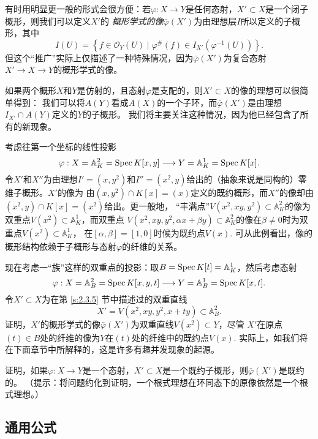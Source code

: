 有时用明显更一般的形式会很方便：若$\varphi: X\to Y$是任何态射，$X'\subset X$是一个闭子概形，则我们可以定义$X'$的
\textit{概形学式的像}$\bar\varphi(X')$为由理想层$I$所以定义的子概形，其中
\[
    I(U)=\left\{f \in \mathscr{O}_Y(U) \mid \varphi^{\#}(f) \in I_{X'}\left(\varphi^{-1}(U)\right)\right\}.
\]%
但这个“推广”实际上仅描述了一种特殊情况，因为$\bar\varphi(X')$为复合态射$X'\to X\to Y$的概形学式的像。

如果两个概形$X$和$Y$是仿射的，且态射$\varphi$是支配的，则$X'\subset X$的像的理想可以很简单得到：
我们可以将$A(Y)$看成$A(X)$的一个子环，而$\bar\varphi(X')$是由理想$I_{X'}\cap A(Y)$定义的$Y$的子概形。
我们将主要关注这种情况，因为他已经包含了所有的新现象。

考虑往第一个坐标的线性投影
\[
    \varphi: X=\mathbb{A}_K^2=\operatorname{Spec} K[x, y] \longrightarrow Y=\mathbb{A}_K^1=\operatorname{Spec} K[x].
\]
令$X'$和$X''$为由理想$I'=(x,y^2)$和$I''=(x^2,y)$给出的（抽象来说是同构的）零维子概形。$X'$的像为
由$(x,y^2)\cap K[x]=(x)$定义的既约概形，而$X''$的像却由$(x^2,y)\cap K[x]=(x^2)$给出。更一般地，
“丰满点”$V(x^2,xy,y^2)\subset \mathbb A_K^2$的像为双重点$V(x^2)\subset \mathbb A_K^1$，而双重点
$V(x^2,xy,y^2,\alpha x+\beta y)\subset \mathbb A_K^2$的像在$\beta\neq 0$时为双重点$V(x^2)\subset \mathbb A_K^1$，
在$[\alpha,\beta]=[1,0]$时候为既约点$V(x)$. 可从此例看出，像的概形结构依赖于子概形与态射$\varphi$的纤维的关系。


\begin{exe}\label{exe:5.4}
    现在考虑一“族”这样的双重点的投影：取$B=\operatorname{Spec} K[t]=\mathbb A_K^1$，然后考虑态射
    \[
        \varphi: X=\mathbb{A}_B^2=\operatorname{Spec} K[x, y, t] \longrightarrow Y=\mathbb{A}_B^1=\operatorname{Spec} K[x, t].
    \]
    令$X'\subset X$为在第 \ref{s:2.3.5} 节中描述过的双重直线
    \[
        X'=V\left(x^2, x y, y^2, x+t y\right) \subset \mathbb{A}_B^2.
    \]
    证明，$X'$的概形学式的像$\bar\varphi(X')$为双重直线$V(x^2)\subset Y$，尽管
    $X'$在原点$(t)\in B$处的纤维的像为$Y$在$(t)$处的纤维中的既约点$V(x)$.
    实际上，如我们将在下面章节中所解释的，这是许多有趣并发现象的起源。
\end{exe}


\begin{exe}\label{exe:5.5}
    证明，如果$\varphi:X\to Y$是一个态射，$X'\subset X$是一个既约子概形，则$\bar\varphi(X')$是既约的。
    （提示：将问题约化到证明，一个根式理想在环同态下的原像依然是一个根式理想。）
\end{exe}

\subsection{通用公式}\label{s:5.1.2}

